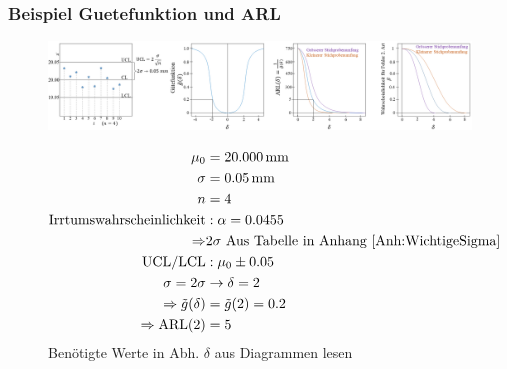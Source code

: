 \subsubsection{Beispiel Guetefunktion und ARL}
\begin{figure}[!h]
	\includegraphics[width=1\linewidth]{figures/Guetefunktion3.png}
	\label{fig:guetefunktion}\\
	\begin{minipage}{1\linewidth}
		\begin{align*}
			\mu_0 &= \SI{20.000}{\milli\meter}\\
			\sigma &= \SI{0.05}{\milli\meter}\\
			n&=4\\
			\text{Irrtumswahrscheinlichkeit} &: \alpha = 0.0455\\
			\Rightarrow  & 2\sigma \text{ Aus Tabelle in Anhang \ref{Anh:WichtigeSigma}}\\
			\text{UCL/LCL}&: \mu_0\pm 0.05\\
			\sigma = 2\sigma &\rightarrow \delta=2\\ 
			\Rightarrow \tilde{g}(\delta) &= \tilde{g}(2)=0.2\\ 
			\Rightarrow \text{ARL}(2) &= 5 
		\end{align*}
	Benötigte Werte in Abh. $\delta$ aus Diagrammen lesen
	\end{minipage}
\end{figure}

